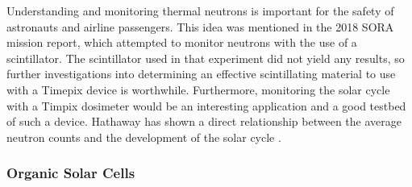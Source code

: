 Understanding and monitoring thermal neutrons is important for the safety of astronauts and airline passengers.
This idea was mentioned in the 2018 SORA mission report, which attempted to monitor neutrons with the use of a scintillator.
The scintillator used in that experiment did not yield any results, so further investigations into determining an effective scintillating material to use with a Timepix device is worthwhile.
Furthermore, monitoring the solar cycle with a Timpix dosimeter would be an interesting application and a good testbed of such a device.
Hathaway has shown a direct relationship between the average neutron counts and the development of the solar cycle \cite{Hathaway-Solar-Cycle}.



\subsubsection{Organic Solar Cells}

